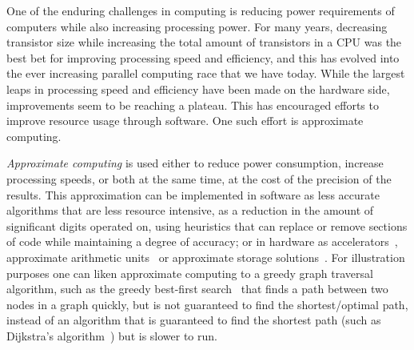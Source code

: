 


One of the enduring challenges in computing is reducing power requirements of computers while also increasing processing power. For many years, decreasing transistor size while increasing the total amount of transistors in a CPU was the best bet for improving processing speed and efficiency, and this has evolved into the ever increasing parallel computing race that we have today. While the largest leaps in processing speed and efficiency have been made on the hardware side, improvements seem to be reaching a plateau. This has encouraged efforts to improve resource usage through software. One such effort is approximate computing. 

\emph{Approximate computing} is used either to reduce power consumption, increase processing speeds, or both at the same time, at the cost of the precision of the results. This approximation can be implemented in software as less accurate algorithms that are less resource intensive, as a reduction in the amount of significant digits operated on, using heuristics that can replace or remove sections of code while maintaining a degree of accuracy; or in hardware as accelerators~\citep{moreau2015snnap}, approximate arithmetic units~\citep{han2013approximate} or approximate storage solutions~\citep{nguyen2020approximate}. For illustration purposes one can liken approximate computing to a greedy graph traversal algorithm, such as the greedy best-first search~\citep{coles2007marvin} that finds a path between two nodes in a graph quickly, but is not guaranteed to find the shortest/optimal path, instead of an algorithm that is guaranteed to find the shortest path (such as Dijkstra's algorithm~\citep{dijkstra1959note}) but is slower to run. 


